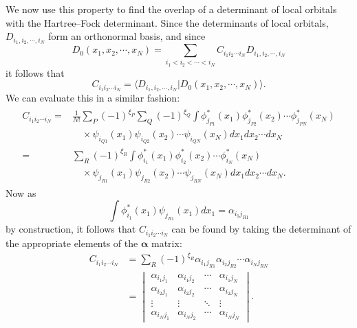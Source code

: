 \documentclass{article}
\newcommand{\bra}{\langle}
\newcommand{\ket}{\rangle}
\begin{document}
We now use this property to find the overlap of a determinant of local orbitals with the Hartree--Fock determinant.  Since the determinants of local orbitals, $D_{i_1,i_2,\cdots,i_N}$ form an orthonormal basis, and since
\begin{displaymath}
D_0(x_1, x_2, \cdots, x_N) = \sum_{i_1<i_2<\cdots<i_N} C_{i_1i_2\cdots i_N} D_{i_1,i_2,\cdots,i_N}
\end{displaymath}
it follows that
\begin{displaymath}
C_{i_1i_2\cdots i_N} = \bra D_{i_1,i_2,\cdots,i_N} | D_0(x_1, x_2, \cdots, x_N) \ket.
\end{displaymath}
We can evaluate this in a similar fashion:
\begin{align*}
\begin{split}
C_{i_1i_2\cdots i_N} = & \frac{1}{N!} \sum_P (-1)^{\xi_P} \sum_Q (-1)^{\xi_Q}
\int \phi_{j_{P1}}^*(x_1) \phi_{j_{P2}}^*(x_2) \cdots \phi_{j_{PN}}^*(x_N)
\\
& \quad \times \psi_{i_{Q1}}(x_1) \psi_{i_{Q2}}(x_2) \cdots \psi_{i_{QN}}(x_N)
dx_1 dx_2 \cdots dx_N \\
= & \sum_R (-1)^{\xi_R} \int 
\phi_{i_{1}}^*(x_1) \phi_{i_{2}}^*(x_2) \cdots \phi_{i_{N}}^*(x_N) \\
& \quad \times \psi_{j_{R1}}(x_1) \psi_{j_{R2}}(x_2) \cdots \psi_{j_{RN}}(x_N)
dx_1 dx_2 \cdots dx_N.
\end{split}
\end{align*}
Now as
\begin{displaymath}
\int \phi_{i_1}^*(x_1) \psi_{j_{R1}}(x_1) dx_1 = \alpha_{i_1 j_{R1}}
\end{displaymath}
by construction, it follows that $C_{i_1i_2\cdots i_N}$ can be found by taking the determinant of the appropriate elements of the $\mathbf{\alpha}$ matrix:
\begin{align*}
C_{i_1i_2\cdots i_N} &= \sum_R (-1)^{\xi_R} \alpha_{i_1 j_{R1}} \alpha_{i_2 j_{R2}} \cdots \alpha_{i_N j_{RN}} \\
                     &= 
\begin{vmatrix}
\alpha_{i_1 j_1} & \alpha_{i_1 j_2} & \cdots & \alpha_{i_1 j_N} \\
\alpha_{i_2 j_1} & \alpha_{i_2 j_2} & \cdots & \alpha_{i_2 j_N} \\
\vdots           & \vdots           & \ddots & \vdots           \\
\alpha_{i_N j_1} & \alpha_{i_N j_2} & \cdots & \alpha_{i_N j_N}
\end{vmatrix}.
\end{align*}
\end{document}
